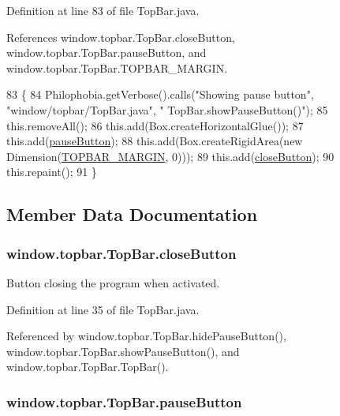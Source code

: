 Definition at line 83 of file Top\-Bar.\-java.



References window.\-topbar.\-Top\-Bar.\-close\-Button, window.\-topbar.\-Top\-Bar.\-pause\-Button, and window.\-topbar.\-Top\-Bar.\-T\-O\-P\-B\-A\-R\-\_\-\-M\-A\-R\-G\-I\-N.


\begin{DoxyCode}
83                                   \{
84         Philophobia.getVerbose().calls(\textcolor{stringliteral}{"Showing pause button"}, \textcolor{stringliteral}{"window/topbar/TopBar.java"}, \textcolor{stringliteral}{"
      TopBar.showPauseButton()"});
85         this.removeAll();
86         this.add(Box.createHorizontalGlue());
87         this.add(\hyperlink{a00031_ac7b4f88657cb97d1ae3df6a99d3694e9}{pauseButton});
88         this.add(Box.createRigidArea(\textcolor{keyword}{new} Dimension(\hyperlink{a00031_a8d48486507d36a825223a21b1b6333ac}{TOPBAR\_MARGIN}, 0)));
89         this.add(\hyperlink{a00031_a98271c11b9bbb79d1e79e03752d4e0b4}{closeButton});
90         this.repaint();
91     \}
\end{DoxyCode}


\subsection{Member Data Documentation}
\hypertarget{a00031_a98271c11b9bbb79d1e79e03752d4e0b4}{
\subsubsection[{close\-Button}]{ window.\-topbar.\-Top\-Bar.\-close\-Button\hspace{0.3cm}{\ttfamily [protected]}}}\label{a00031_a98271c11b9bbb79d1e79e03752d4e0b4}


Button closing the program when activated. 



Definition at line 35 of file Top\-Bar.\-java.



Referenced by window.\-topbar.\-Top\-Bar.\-hide\-Pause\-Button(), window.\-topbar.\-Top\-Bar.\-show\-Pause\-Button(), and window.\-topbar.\-Top\-Bar.\-Top\-Bar().

\hypertarget{a00031_ac7b4f88657cb97d1ae3df6a99d3694e9}{
\subsubsection[{pause\-Button}]{ window.\-topbar.\-Top\-Bar.\-pause\-Button\hspace{0.3cm}{\ttfamily [protected]}}}\label{a00031_ac7b4f88657cb97d1ae3df6a99d3694e9}


